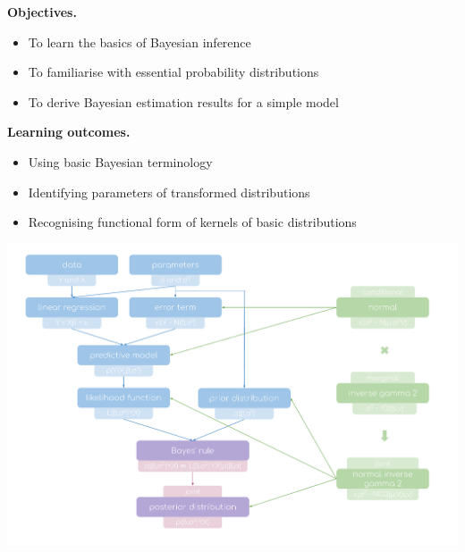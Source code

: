 \documentclass[notes,blackandwhite,mathsans]{beamer}
\begin{document}
{
\begin{frame}

\bigskip\textbf{\color{mcxs1}Objectives.}
\begin{itemize}[label=$\blacktriangleright$]
\item {\color{mcxs1}To learn the basics of Bayesian inference}
\item {\color{mcxs1}To familiarise with essential probability distributions}
\item {\color{mcxs1}To derive Bayesian estimation results for a simple model}
\end{itemize}

\bigskip\textbf{\color{mcxs3}Learning outcomes.}
\begin{itemize}[label=$\blacktriangleright$]
\item {\color{mcxs3}Using basic Bayesian terminology}
\item {\color{mcxs3}Identifying parameters of transformed distributions}
\item {\color{mcxs3}Recognising functional form of kernels of basic distributions}
\end{itemize}

\end{frame}
}





\begin{frame}

\centering
\includegraphics[scale=0.45, trim= 1.8cm 2cm 2cm 0.5cm]{grphs/03conceptmap.pdf}

\end{frame}
\end{document}

